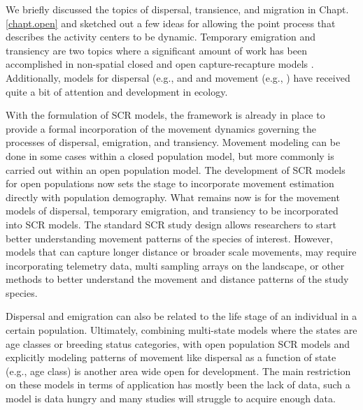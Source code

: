 We briefly discussed the topics of dispersal,
transience, and migration in Chapt. \ref{chapt.open} and sketched out
a few ideas for allowing the point process that describes the activity centers
to be dynamic. %
Temporary emigration and transiency are two topics where
a significant amount of work has been accomplished in non-spatial closed and open capture-recapture
models \citep{kendall_etal:1997, pradel_hines:1997, hines_etal:2003,
clavel_etal:2008, gilroy_etal:2012,chandler_etal:2011}.
Additionally, models for dispersal (e.g., \citet{clobert_etal:2001,
ovaskainen:2004, ovaskainen_etal:2008} and 
and movement (e.g., \cite{jonsen_etal:2005, johnson_etal:2008b,
mcclintock_etal:2012}) have received quite a bit of attention and development in
ecology.

With the formulation of SCR models, the framework is already in place to provide
a formal incorporation of the movement dynamics governing the processes
of dispersal, emigration, and transiency. Movement modeling can be done 
in some cases within a closed
population model, but more commonly is carried out within an open population model.
The development of SCR models for open populations \citep{gardner_etal:2012} now sets 
the stage to incorporate
movement estimation directly with population demography. What remains now is for the 
movement models 
of dispersal, temporary emigration, and transiency to be incorporated into SCR models.
The standard SCR study design allows researchers to start better understanding movement patterns of 
the species of interest.  However, models that can capture longer distance or broader scale movements,
may require incorporating telemetry data, multi sampling arrays on the landscape, or other 
methods to better understand the movement and distance patterns of the study species.

Dispersal and emigration can also be related to the life stage of an individual in
a certain population.  Ultimately, combining multi-state models where the states are 
age classes or breeding status categories, with open population SCR models and explicitly
modeling patterns of movement like dispersal as a function of state (e.g., age class) is 
another area wide open for development.  The main restriction on these models in terms
of application has mostly been the lack of data, such a model is data hungry and many studies
will struggle to acquire enough data.







